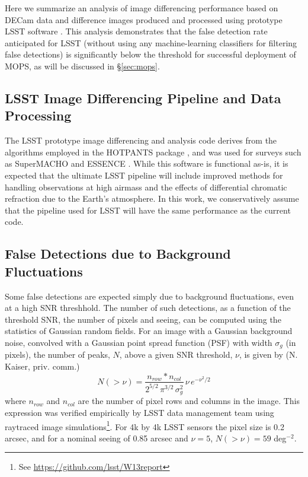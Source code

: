 Here we summarize an analysis of image differencing performance based on DECam
data and difference images produced and processed using prototype LSST
software \citep{DMTN-006}. This analysis demonstrates that the false
detection rate anticipated for LSST (without using any machine-learning classifiers for
filtering false detections) is significantly below the threshold for
successful deployment of MOPS, as will be discussed in \S\ref{sec:mops}.



\subsection{LSST Image Differencing Pipeline and Data Processing}

The LSST prototype image differencing and analysis code derives from the
algorithms employed in the HOTPANTS package \citep{becker15}, and was used for surveys such as SuperMACHO
\citep{becker05} and ESSENCE \citep{miknaitis07}. While this software is
functional as-is, it is expected that the ultimate LSST pipeline will include
improved methods for handling observations at high airmass and the effects of
differential chromatic refraction due to the Earth's atmosphere. In
this work, we conservatively assume that the pipeline used for LSST will have the
same performance as the current code.


\subsection{False Detections due to Background Fluctuations \label{sec:kaiser}}

Some false detections are expected simply due to background fluctuations, even
at a high SNR threshhold. The number of
such detections, as a function of the threshold SNR, the number of pixels and
seeing, can be computed using the statistics of Gaussian random fields.
For an image with a Gaussian background noise, convolved with a Gaussian point
spread function (PSF) with width $\sigma_g$ (in pixels), the number of peaks, $N$, above a
given SNR threshold, $\nu$, is given by (N. Kaiser, priv. comm.)
\begin{equation}
N(>\nu)  = \frac{n_{row}*n_{col}}{2^{5/2} \, \pi^{3/2} \, \sigma_g^2} \, \nu \, e^{-\nu^2 /2}
\label{eq-theory}
\end{equation}
where $n_{row}$ and $n_{col}$ are the number of pixel rows and columns in the image.
This expression was verified empirically by LSST data management team using
raytraced image simulations\footnote{See \url{https://github.com/lsst/W13report}}.
For 4k by 4k LSST sensors the pixel size is 0.2 arcsec, and for a nominal seeing
of 0.85 arcsec and $\nu=5$, $N(>\nu) = 59$ deg$^{-2}$.

